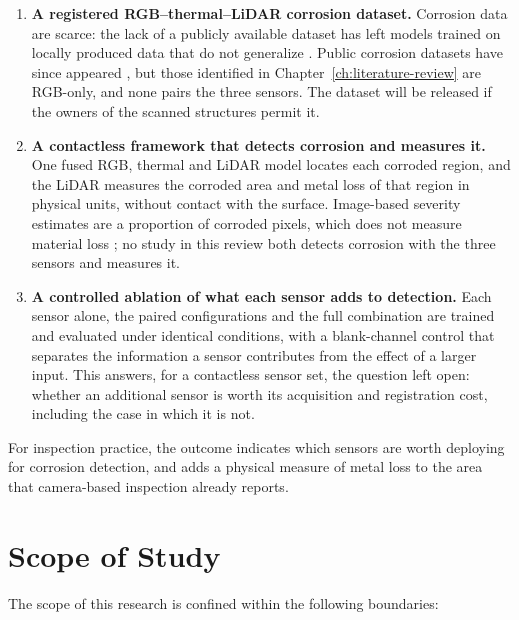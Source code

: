 \begin{enumerate}[label=\arabic*),leftmargin=*,itemsep=5pt]
  \item \textbf{A registered RGB--thermal--LiDAR corrosion dataset.}
        Corrosion data are scarce: the lack of a publicly available dataset
        has left models trained on locally produced data that do not
        generalize \citep{Nash2022}. Public corrosion datasets have since
        appeared \citep{Espinoza2026}, but those identified in
        Chapter~\ref{ch:literature-review} are RGB-only, and none pairs the
        three sensors. The dataset will be
        released if the owners of the scanned structures permit it.
  \item \textbf{A contactless framework that detects corrosion and measures
        it.} One fused RGB, thermal and LiDAR model locates each corroded
        region, and the LiDAR measures the corroded area and metal loss of that
        region in physical units, without contact with the surface. Image-based
        severity estimates are a proportion of corroded pixels, which does not
        measure material loss \citep{Alvani2026}; no study in this review both
        detects corrosion with the three sensors and measures it.
  \item \textbf{A controlled ablation of what each sensor adds to
        detection.} Each sensor alone, the paired configurations and the full
        combination are trained and evaluated under identical conditions, with
        a blank-channel control that separates the information a sensor
        contributes from the effect of a larger input. This answers, for a
        contactless sensor set, the question \citet{Haitz2022} left open:
        whether an additional sensor is worth its acquisition and registration
        cost, including the case in which it is not.
\end{enumerate}

For inspection practice, the outcome indicates which sensors are worth
deploying for corrosion detection, and adds a physical measure of metal loss to
the area that camera-based inspection already reports.

\section{Scope of Study}
\label{sec:scope}

The scope of this research is confined within the following boundaries:

